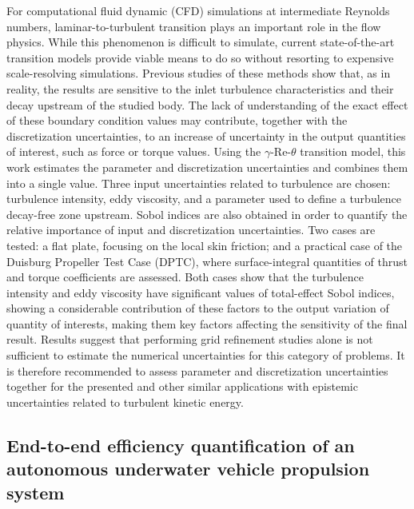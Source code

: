 \documentclass[a4paper,10pt]{article}
\begin{document}
For computational fluid dynamic (CFD) simulations at intermediate Reynolds numbers, laminar-to-turbulent transition plays an important role in the flow physics. While this phenomenon is difficult to simulate, current state-of-the-art transition models provide viable means to do so without resorting to expensive scale-resolving simulations. Previous studies of these methods show that, as in reality, the results are sensitive to the inlet turbulence characteristics and their decay upstream of the studied body. The lack of understanding of the exact effect of these boundary condition values may contribute, together with the discretization uncertainties, to an increase of uncertainty in the output quantities of interest, such as force or torque values. Using the $\gamma$-Re-$\theta$ transition model, this work estimates the parameter and discretization uncertainties and combines them into a single value. Three input uncertainties related to turbulence are chosen: turbulence intensity, eddy viscosity, and a parameter used to define a turbulence decay-free zone upstream. Sobol indices are also obtained in order to quantify the relative importance of input and discretization uncertainties. Two cases are tested: a flat plate, focusing on the local skin friction; and a practical case of the Duisburg Propeller Test Case (DPTC), where surface-integral quantities of thrust and torque coefficients are assessed. Both cases show that the turbulence intensity and eddy viscosity have significant values of total-effect Sobol indices, showing a considerable contribution of these factors to the output variation of quantity of interests, making them key factors affecting the sensitivity of the final result. Results suggest that performing grid refinement studies alone is not sufficient to estimate the numerical uncertainties for this category of problems. It is therefore recommended to assess parameter and discretization uncertainties together for the presented and other similar applications with epistemic uncertainties related to turbulent kinetic energy.

\subsection{End-to-end efficiency quantification of an autonomous underwater vehicle propulsion system \cite{Lidtke2021a}}
\end{document}
